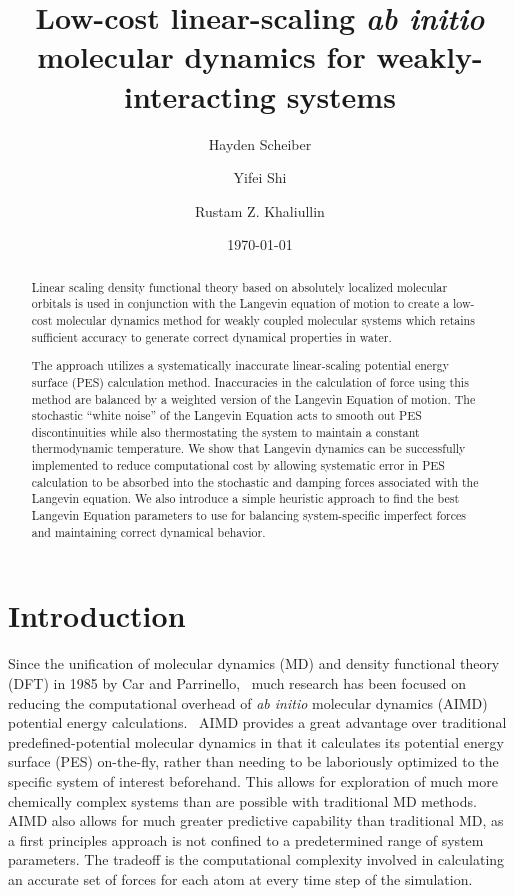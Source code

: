 \documentclass[10pt,aps,prl,twocolumn,amsmath,amssymb,superscriptaddress,longbibliography]{revtex4-1}
\begin{document}
\title{
Low-cost linear-scaling \emph{ab initio} molecular dynamics for weakly-interacting systems
}

\author{Hayden Scheiber}
\author{Yifei Shi}
\author{Rustam Z. Khaliullin}

\date{\today}

\begin{abstract}
Linear scaling density functional theory based on absolutely localized molecular orbitals is used in conjunction with the Langevin equation of motion to create a low-cost molecular dynamics method for weakly coupled molecular systems which retains sufficient accuracy to generate correct dynamical properties in water. 

The approach utilizes a systematically inaccurate linear-scaling potential energy surface (PES) calculation method. 
Inaccuracies in the calculation of force using this method are balanced by a weighted version of the Langevin Equation of motion. 
The stochastic ``white noise'' of the Langevin Equation acts to smooth out PES discontinuities while also thermostating the system to maintain a constant thermodynamic temperature. 
We show that Langevin dynamics can be successfully implemented to reduce computational cost by allowing systematic error in PES calculation to be absorbed into the stochastic and damping forces associated with the Langevin equation. 
We also introduce a simple heuristic approach to find the best Langevin Equation parameters to use for balancing system-specific imperfect forces and maintaining correct dynamical behavior.
\end{abstract}

\maketitle
\section{Introduction}
Since the unification of molecular dynamics (MD) and density functional theory (DFT) in 1985 by Car and Parrinello,~\cite{a:thecpmd} much research has been focused on reducing the computational overhead of \emph{ab initio} molecular dynamics (AIMD) potential energy calculations.~\cite{b:aimd} 
AIMD provides a great advantage over traditional predefined-potential molecular dynamics in that it calculates its potential energy surface (PES) on-the-fly, rather than needing to be laboriously optimized to the specific system of interest beforehand. 
This allows for exploration of much more chemically complex systems than are possible with traditional MD methods. 
AIMD also allows for much greater predictive capability than traditional MD, as a first principles approach is not confined to a predetermined range of system parameters. 
The tradeoff is the computational complexity involved in calculating an accurate set of forces for each atom at every time step of the simulation.~\cite{a:2gen-cpmd}
\end{document}
